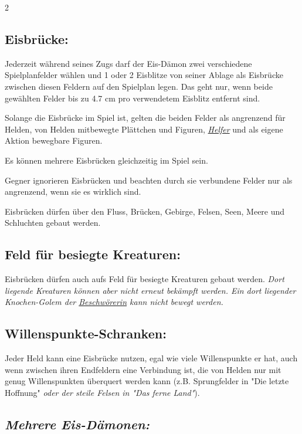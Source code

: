 \documentclass[10pt, a4paper, oneside]{book}
\newcommand{\fan}[1]{\textit{#1}}
\begin{document}
\begin{multicols*}{2}
\begin{nobgcolor}
\subsection{Eisbrücke:}

Jederzeit während seines Zugs darf der Eis-Dämon zwei verschiedene Spielplanfelder wählen und 1 oder 2 Eisblitze von seiner Ablage als Eisbrücke zwischen diesen Feldern auf den Spielplan legen.
\supercite{MH:Begleitheft}
Das geht nur, wenn beide gewählten Felder bis zu 4.7 cm pro verwendetem Eisblitz entfernt sind. 

Solange die Eisbrücke im Spiel ist, gelten die beiden Felder als angrenzend für Helden, von Helden mitbewegte Plättchen und Figuren, \hyperref[Helfer]{\fan{Helfer}} und als eigene Aktion bewegbare Figuren. 
\supercite{88780}

Es können mehrere Eisbrücken gleichzeitig im Spiel sein.

Gegner ignorieren Eisbrücken und beachten durch sie verbundene Felder nur als angrenzend, wenn sie es wirklich sind.
\supercite{MH:Kälte}

Eisbrücken dürfen über den Fluss, Brücken, Gebirge, Felsen, Seen, Meere und Schluchten gebaut werden.
\supercite{MH:Begleitheft}




\subsection{Feld für besiegte Kreaturen:}

Eisbrücken dürfen auch aufs Feld für besiegte Kreaturen gebaut werden.\supercite{88778} \fan{Dort liegende Kreaturen können aber nicht erneut bekämpft werden. Ein dort liegender Knochen-Golem der \hyperref[Beschwörerin]{Beschwörerin} kann nicht bewegt werden.}



\subsection{Willenspunkte-Schranken:}

Jeder Held kann eine Eisbrücke nutzen, egal wie viele Willenspunkte er hat, auch wenn zwischen ihren Endfeldern eine Verbindung ist, die von Helden nur mit genug Willenspunkten überquert werden kann (z.B. Sprungfelder in "Die letzte Hoffnung"\supercite{MH11:Heldenkarte_Eis-Dämon} \fan{oder der steile Felsen in "Das ferne Land"}).




\subsection{\fan{Mehrere Eis-Dämonen:}}


\end{nobgcolor}
\end{multicols*}
\end{document}
